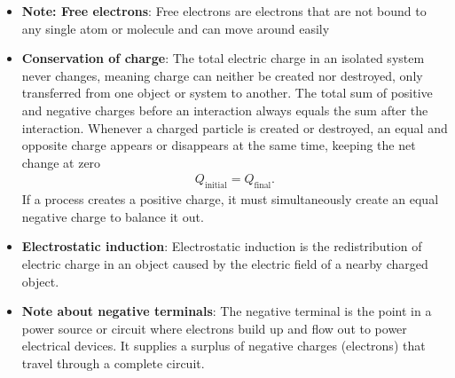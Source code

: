 \documentclass{report}
\begin{document}
\begin{itemize}
            \bigbreak \noindent 
            \bigbreak \noindent 
            The positively charged plate and the negatively charged plate are attracted to each other. Separating them requires work to be done against that attraction. The energy required to do this is stored in the electric charges in the two plates as potential energy. This is the energy that is stored when the capacitor is charged, and then released when the capacitor is discharged.
            \bigbreak \noindent 
            Three things determine how much electric charge a capacitor can store:
            \begin{itemize}
                \item The size of the plates - the bigger the better.
                \item How close the plates are together - the closer the better.
                \item How good the insulator (the dielectric) is. Examples are: air, paper, glass, and rubber.
            \end{itemize}
        \item \textbf{Note: Free electrons}: Free electrons are electrons that are not bound to any single atom or molecule and can move around easily
        \item \textbf{Conservation of charge}: The total electric charge in an isolated system never changes, meaning charge can neither be created nor destroyed, only transferred from one object or system to another.  The total sum of positive and negative charges before an interaction always equals the sum after the interaction.
            \bigbreak \noindent 
            Whenever a charged particle is created or destroyed, an equal and opposite charge appears or disappears at the same time, keeping the net change at zero
            \begin{align*}
                Q_{\text{initial}} = Q_{\text{final}}
            .\end{align*}
            If a process creates a positive charge, it must simultaneously create an equal negative charge to balance it out.
        \item \textbf{Electrostatic induction}: Electrostatic induction is the redistribution of electric charge in an object caused by the electric field of a nearby charged object. 
        \item \textbf{Note about negative terminals}: The negative terminal is the point in a power source or circuit where electrons build up and flow out to power electrical devices.  It supplies a surplus of negative charges (electrons) that travel through a complete circuit.

\end{itemize}
\end{document}
